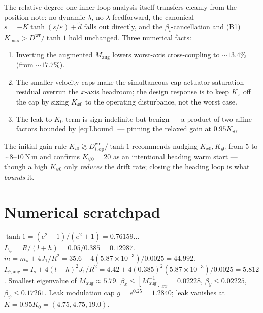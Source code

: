 \documentclass[11pt]{article}
\theoremstyle{plain}
\theoremstyle{definition}
\newcommand{\Maug}{M_{\mathrm{aug}}}
\newcommand{\Dwr}{D^{\mathrm{wr}}}
\newcommand{\Kmax}{K_{\max}}
\begin{document}
The relative-degree-one inner-loop analysis itself transfers cleanly from the position
note: no dynamic $\lambda$, no $\dot\lambda$ feedforward, the canonical
$\dot s=-\tilde K\tanh(s/\varepsilon)+\tilde d$ falls out directly, and the
$\beta_i$-cancellation and (B1) $\Kmax>\Dwr/\tanh1$ hold unchanged. Three numerical
facts:
\begin{enumerate}[leftmargin=2em]
\item Inverting the augmented $\Maug$ lowers worst-axis cross-coupling to
${\sim}13.4\%$ (from ${\sim}17.7\%$).
\item The smaller velocity caps make the simultaneous-cap actuator-saturation residual
overrun the $x$-axis headroom; the design response is to keep $K_x$ off the cap by
sizing $K_{x0}$ to the operating disturbance, not the worst case.
\item The leak-to-$K_0$ term is sign-indefinite but benign --- a product of two affine
factors bounded by \eqref{eq:Lbound} --- pinning the relaxed gain at $0.95K_{i0}$.
\end{enumerate}
The initial-gain rule $K_{i0}\gtrsim\Dwr_{i,\mathrm{op}}/\tanh1$ recommends nudging
$K_{x0},K_{y0}$ from $5$ to ${\sim}8$--$10\,$N\,m and confirms $K_{\psi0}=20$ as an
intentional heading warm start --- though a high $K_{\psi0}$ only \emph{reduces} the
drift rate; closing the heading loop is what \emph{bounds} it.

\appendix
\section{Numerical scratchpad}
\label{sec:scratch}
$\tanh1=(e^2-1)/(e^2+1)=0.76159\ldots$\quad
$L_\psi=R/(l+h)=0.05/0.385=0.12987$.\quad
$\tilde m=m_s+4J_1/R^2=35.6+4(5.87\times10^{-3})/0.0025=44.992$.\quad
$I_{\psi,\mathrm{aug}}=I_s+4(l+h)^2J_1/R^2=4.42+4(0.385)^2(5.87\times10^{-3})/0.0025=5.812$.\quad
Smallest eigenvalue of $\Maug\approx5.79$.\quad
$\beta_x\le[\Maug^{-1}]_{xx}=0.02228$, $\beta_y\le0.02225$,
$\beta_\psi\le0.17261$.\quad
Leak modulation cap $\bar g=e^{0.25}=1.2840$; leak vanishes at $K=0.95K_0=(4.75,4.75,19.0)$.
\end{document}
